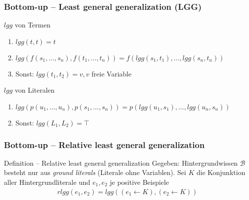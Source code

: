 \begin{frame}
	\frametitle{Bottom-up -- Least general generalization (LGG)}
	\begin{block}{$lgg$ von Termen}
		\begin{enumerate}
			\item $lgg(t,t) = t$\\
			\item $lgg(f(s_1, \ldots, s_n), f(t_1, \ldots, t_n)) = f(lgg(s_1, t_1), \ldots, lgg(s_n, t_n))$
			\item Sonst: $lgg(t_1, t_2) = v , v$ freie Variable
		\end{enumerate}
	\end{block}
	\begin{block}{$lgg$ von Literalen}
	\begin{enumerate}
		\item $lgg(p(u_1, \ldots, u_n), p(s_1, \ldots, s_n)) = p(lgg(u_1, s_1), \ldots, lgg(u_n, s_n))$\\
		\item Sonst: $lgg(L_1, L_2) = \top$
	\end{enumerate}
	\end{block}
\end{frame}


\begin{frame}
\frametitle{Bottom-up -- Relative least general generalization}
\begin{block}{Definition -- Relative least general generalization}
	Gegeben: Hintergrundwissen $\mathcal{B}$ besteht nur aus \emph{ground literals} (Literale ohne Variablen).
	Sei $K$ die Konjunktion aller Hintergrundliterale und $e_1, e_2$ je positive Beispiele
	\begin{align*}
		rlgg(e_1, e_2) = lgg((e_1 \leftarrow K), (e_2 \leftarrow K))
	\end{align*}
\end{block}

\end{frame}


